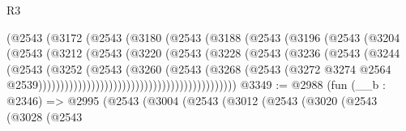 \begin{lexlean}{R3}
\begin{coremodule}
                                      (@2543
                                        (@3172
                                          (@2543
                                            (@3180
                                              (@2543
                                                (@3188
                                                  (@2543
                                                    (@3196
                                                      (@2543
                                                        (@3204
                                                          (@2543
                                                            (@3212
                                                              (@2543
                                                                (@3220
                                                                  (@2543
                                                                    (@3228
                                                                      (@2543
                                                                        (@3236
                                                                          (@2543
                                                                            (@3244
                                                                              (@2543
                                                                                (@3252
                                                                                  (@2543
                                                                                    (@3260
                                                                                      (@2543
                                                                                        (@3268
                                                                                          (@2543
                                                                                            (@3272
                                                                                              @3274
                                                                                              @2564
                                                                                              @2539)))))))))))))))))))))))))))))))))))))))))))))
@3349 := @2988
    (fun (__b : @2346) =>
    @2995
      (@2543
        (@3004
          (@2543
            (@3012
              (@2543
                (@3020
                  (@2543
                    (@3028
                      (@2543

\end{coremodule}
\end{lexlean}
